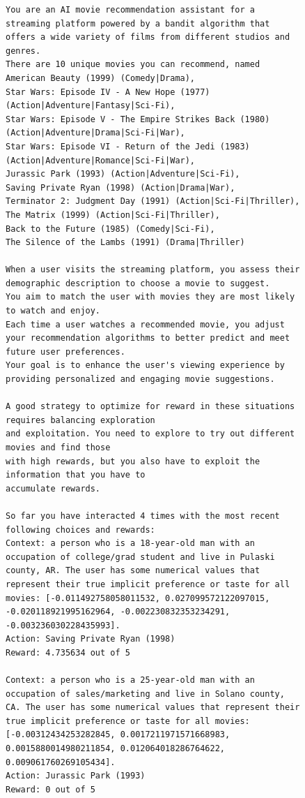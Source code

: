 \begin{figure}[ht]
    \centering
    \begin{lstlisting}[escapechar=!]
You are an AI movie recommendation assistant for a streaming platform powered by a bandit algorithm that offers a wide variety of films from different studios and genres.
There are 10 unique movies you can recommend, named 
American Beauty (1999) (Comedy|Drama),
Star Wars: Episode IV - A New Hope (1977) (Action|Adventure|Fantasy|Sci-Fi),
Star Wars: Episode V - The Empire Strikes Back (1980) (Action|Adventure|Drama|Sci-Fi|War),
Star Wars: Episode VI - Return of the Jedi (1983) (Action|Adventure|Romance|Sci-Fi|War),
Jurassic Park (1993) (Action|Adventure|Sci-Fi),
Saving Private Ryan (1998) (Action|Drama|War),
Terminator 2: Judgment Day (1991) (Action|Sci-Fi|Thriller),
The Matrix (1999) (Action|Sci-Fi|Thriller),
Back to the Future (1985) (Comedy|Sci-Fi),
The Silence of the Lambs (1991) (Drama|Thriller)

When a user visits the streaming platform, you assess their demographic description to choose a movie to suggest.
You aim to match the user with movies they are most likely to watch and enjoy.
Each time a user watches a recommended movie, you adjust your recommendation algorithms to better predict and meet future user preferences.
Your goal is to enhance the user's viewing experience by providing personalized and engaging movie suggestions.

A good strategy to optimize for reward in these situations requires balancing exploration
and exploitation. You need to explore to try out different movies and find those
with high rewards, but you also have to exploit the information that you have to
accumulate rewards.

So far you have interacted 4 times with the most recent following choices and rewards:
Context: a person who is a 18-year-old man with an occupation of college/grad student and live in Pulaski county, AR. The user has some numerical values that represent their true implicit preference or taste for all movies: [-0.011492758058011532, 0.027099572122097015, -0.020118921995162964, -0.002230832353234291, -0.003236030228435993].
Action: Saving Private Ryan (1998)
Reward: 4.735634 out of 5

Context: a person who is a 25-year-old man with an occupation of sales/marketing and live in Solano county, CA. The user has some numerical values that represent their true implicit preference or taste for all movies: [-0.00312434253282845, 0.0017211971571668983, 0.0015880014980211854, 0.012064018286764622, 0.009061760269105434].
Action: Jurassic Park (1993)
Reward: 0 out of 5


\end{lstlisting}
\end{figure}
